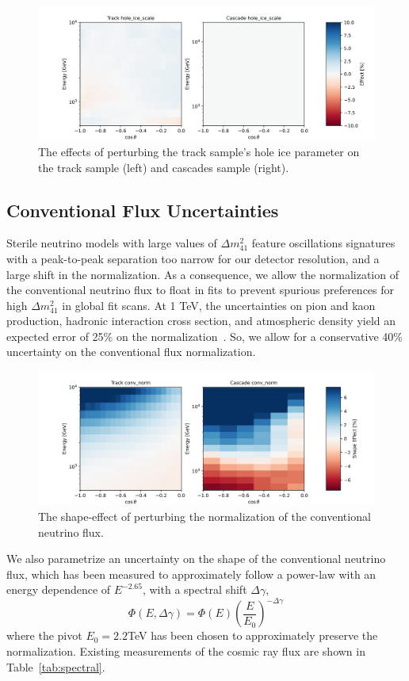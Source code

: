 \documentclass[main.tex]{subfiles}
\begin{document}
\begin{figure}
    \centering
    \includegraphics[width=0.8\linewidth]{figures/systematics/hole_ice_scale.png}
    \caption{The effects of perturbing the track sample's hole ice parameter on the track sample (left) and cascades sample (right).}\label{fig:track_hole}
\end{figure}

\subsection{Conventional Flux Uncertainties}\label{sec:barr_hg}
Sterile neutrino models with large values of $\Delta m_{41}^{2}$ feature oscillations signatures with a peak-to-peak separation too narrow for our detector resolution, and a large shift in the normalization. 
As a consequence, we allow the normalization of the conventional neutrino flux to float in fits to prevent spurious preferences for high $\Delta m_{41}^{2}$ in global fit scans. 
At 1 TeV, the uncertainties on pion and kaon production, hadronic interaction cross section, and atmospheric density yield an expected error of 25\% on the normalization~\cite{Aartsen_2020_prd}. 
So, we allow for a conservative 40\% uncertainty on the conventional flux normalization.

\begin{figure}
    \centering
    \includegraphics[width=0.8\linewidth]{figures/systematics/conv_norm.png}
    \caption{The shape-effect of perturbing the normalization of the conventional neutrino flux.}
\end{figure}


We also parametrize an uncertainty on the shape of the conventional neutrino flux, which has been measured to approximately follow a power-law with an energy dependence of $E^{-2.65}$, with a spectral shift $\Delta \gamma$,
\begin{equation}
\Phi(E, \Delta \gamma) = \Phi(E)\left(\dfrac{E}{E_{0}}\right)^{-\Delta\gamma}
\end{equation}
where the pivot $E_{0}=2.2$TeV has been chosen to approximately preserve the normalization. 
Existing measurements of the cosmic ray flux are shown in Table~\ref{tab:spectral}. 
\end{document}
